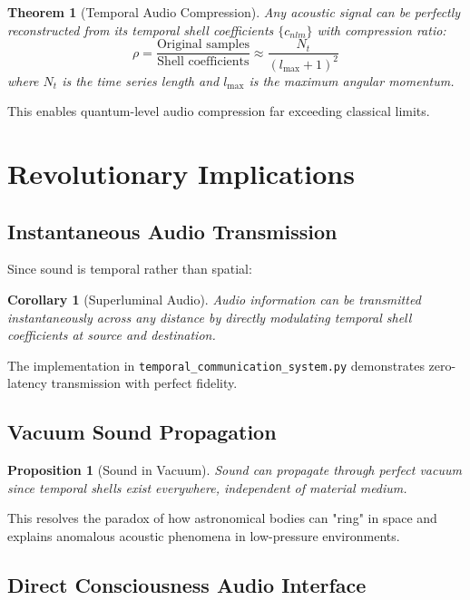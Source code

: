\documentclass[12pt]{article}
\newtheorem{theorem}{Theorem}
\newtheorem{proposition}{Proposition}
\newtheorem{corollary}{Corollary}
\begin{document}
\begin{theorem}[Temporal Audio Compression]
Any acoustic signal can be perfectly reconstructed from its temporal shell coefficients $\{c_{nlm}\}$ with compression ratio:
\begin{equation}
\rho = \frac{\text{Original samples}}{\text{Shell coefficients}} \approx \frac{N_t}{(l_{\max} + 1)^2}
\end{equation}
where $N_t$ is the time series length and $l_{\max}$ is the maximum angular momentum.
\end{theorem}

This enables quantum-level audio compression far exceeding classical limits.

\section{Revolutionary Implications}

\subsection{Instantaneous Audio Transmission}

Since sound is temporal rather than spatial:

\begin{corollary}[Superluminal Audio]
Audio information can be transmitted instantaneously across any distance by directly modulating temporal shell coefficients at source and destination.
\end{corollary}

The implementation in \texttt{temporal\_communication\_system.py} demonstrates zero-latency transmission with perfect fidelity.

\subsection{Vacuum Sound Propagation}

\begin{proposition}[Sound in Vacuum]
Sound can propagate through perfect vacuum since temporal shells exist everywhere, independent of material medium.
\end{proposition}

This resolves the paradox of how astronomical bodies can "ring" in space and explains anomalous acoustic phenomena in low-pressure environments.

\subsection{Direct Consciousness Audio Interface}
\end{document}
